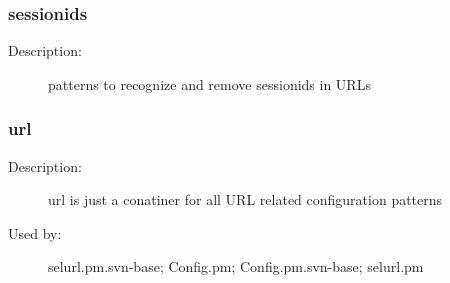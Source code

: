 \subsubsection{sessionids}
\label{sessionids}
\begin{description}
\item[Description:] patterns to recognize and remove sessionids in URLs
\end{description}
\subsubsection{url}
\label{url}
\begin{description}
\item[Description:] url is just a conatiner for all URL related configuration patterns
\item[Used by:] selurl.pm.svn-base; Config.pm; Config.pm.svn-base; selurl.pm
\end{description}
